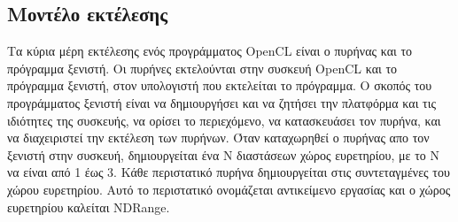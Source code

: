 \subsection{Μοντέλο εκτέλεσης}
Τα κύρια μέρη εκτέλεσης ενός προγράμματος OpenCL είναι ο πυρήνας και το πρόγραμμα ξενιστή. Οι πυρήνες εκτελούνται στην συσκευή OpenCL και το πρόγραμμα ξενιστή, στον υπολογιστή που εκτελείται το πρόγραμμα. Ο σκοπός του προγράμματος ξενιστή είναι να δημιουργήσει και να ζητήσει την πλατφόρμα και τις ιδιότητες της συσκευής, να ορίσει το περιεχόμενο, να κατασκευάσει τον πυρήνα, και να διαχειριστεί την εκτέλεση των πυρήνων. Όταν καταχωρηθεί ο πυρήνας απο τον ξενιστή στην συσκευή, δημιουργείται ένα Ν διαστάσεων χώρος ευρετηρίου, με το Ν να είναι από 1 έως 3. Κάθε περιστατικό πυρήνα δημιουργείται στις συντεταγμένες του χώρου ευρετηρίου. Αυτό το περιστατικό ονομάζεται αντικείμενο εργασίας και ο χώρος ευρετηρίου καλείται NDRange.

